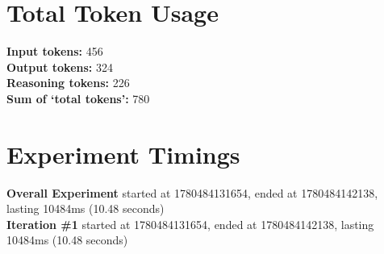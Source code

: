 \documentclass{article}
\begin{document}
\section*{Total Token Usage}
\textbf{Input tokens: }456
\\\textbf{Output tokens: }324
\\\textbf{Reasoning tokens: }226
\\\textbf{Sum of `total tokens': }780
\section*{Experiment Timings}
\textbf{Overall Experiment} started at 1780484131654, ended at 1780484142138, lasting 10484ms (10.48 seconds)
\\\textbf{Iteration \#1} started at 1780484131654, ended at 1780484142138, lasting 10484ms (10.48 seconds)
\end{document}

